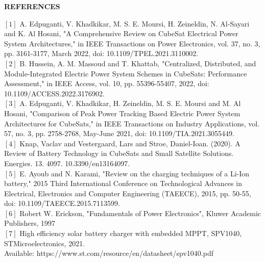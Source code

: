 \thispagestyle{plain}

\begin{center}
	\Large {\bf \uppercase{References}}
\end{center}

\vspace{3\baselineskip}
\noindent
\setlength\parindent{0pt}
$[1]$ A. Edpuganti, V. Khadkikar, M. S. E. Moursi, H. Zeineldin, N. Al-Sayari and K. Al Hosani, "A Comprehensive Review on CubeSat Electrical Power System Architectures," in IEEE Transactions on Power Electronics, vol. 37, no. 3, pp. 3161-3177, March 2022, doi: 10.1109/TPEL.2021.3110002.
\vspace{3.5pt}
\\ 
$[2]$ B. Hussein, A. M. Massoud and T. Khattab, "Centralized, Distributed, and Module-Integrated Electric Power System Schemes in CubeSats: Performance Assessment," in IEEE Access, vol. 10, pp. 55396-55407, 2022, doi: 10.1109/ACCESS.2022.3176902.
\vspace{3.5pt}
\\ 
$[3]$ A. Edpuganti, V. Khadkikar, H. Zeineldin, M. S. E. Moursi and M. Al Hosani, "Comparison of Peak Power Tracking Based Electric Power System Architectures for CubeSats," in IEEE Transactions on Industry Applications, vol. 57, no. 3, pp. 2758-2768, May-June 2021, doi: 10.1109/TIA.2021.3055449.
\vspace{3.5pt}
\\
$[4]$ Knap, Vaclav and Vestergaard, Lars and Stroe, Daniel-Ioan. (2020). A Review of Battery Technology in CubeSats and Small Satellite Solutions. Energies. 13. 4097. 10.3390/en13164097.
 \vspace{3.5pt}
 \\ 
$[5]$ E. Ayoub and N. Karami, "Review on the charging techniques of a Li-Ion battery," 2015 Third International Conference on Technological Advances in Electrical, Electronics and Computer Engineering (TAEECE), 2015, pp. 50-55, doi: 10.1109/TAEECE.2015.7113599.
\vspace{3.5pt}
\\ 
$[6]$ Robert W. Erickson, "Fundamentals of Power Electronics", Kluwer Academic Publishers, 1997
\vspace{3.5pt}
\\ 
$[7]$ High efficiency solar battery charger with embedded MPPT, SPV1040, STMicroelectronics, 2021.\\Available: https://www.st.com/resource/en/datasheet/spv1040.pdf\vspace{3.5pt}
